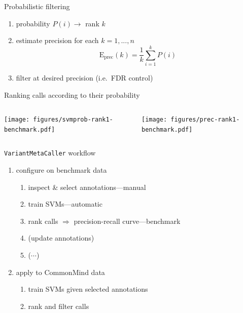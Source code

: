 \documentclass{beamer}
\begin{document}
\begin{frame}{Probabilistic filtering}
\begin{enumerate}
\item probability \(P(i) \rightarrow \) rank \(k\)
\item estimate precision for each \(k=1,...,n\)
\[
\mathrm{E}_\mathrm{prec}(k) = \frac{1}{k} \sum_{i=1}^k P(i)
\] 
\item filter at desired precision (i.e.~FDR control)
\end{enumerate}
\end{frame}

\begin{frame}{Ranking calls according to their probability}
\begin{columns}[t]
\begin{column}{0.5\textwidth}

\texttt{[image: figures/svmprob-rank1-benchmark.pdf]}
\end{column}

\begin{column}{0.5\textwidth}

\texttt{[image: figures/prec-rank1-benchmark.pdf]}
\end{column}
\end{columns}
\end{frame}

\begin{frame}{\texttt{VariantMetaCaller} workflow}
\begin{enumerate}
\item<2> configure on benchmark data
\begin{enumerate}
\item inspect \& select annotations---manual
\item train SVMs---automatic
\item rank calls \(\Rightarrow\) precision-recall curve---benchmark
\item (update annotations)
\item (\(\cdots\))
\end{enumerate}
\item apply to CommonMind data
\begin{enumerate}
\item train SVMs given selected annotations
\item rank and filter calls
\end{enumerate}
\end{enumerate} 
\end{frame}
\end{document}
